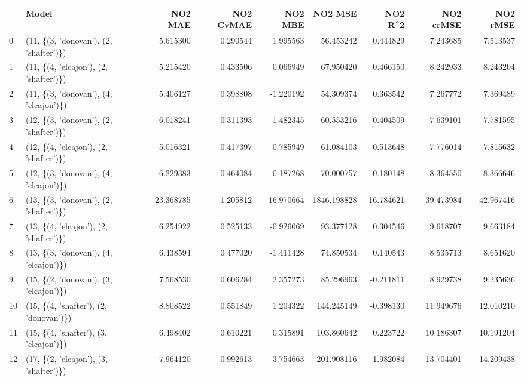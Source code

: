 \begin{tabular}{llrrrrrrr}
\toprule
{} &                                   Model &    NO2 MAE &  NO2 CvMAE &    NO2 MBE &      NO2 MSE &    NO2 R\textasciicircum2 &  NO2 crMSE &   NO2 rMSE \\
\midrule
0  &  (11, \{(3, 'donovan'), (2, 'shafter')\}) &   5.615300 &   0.290544 &   1.995563 &    56.453242 &   0.444829 &   7.243685 &   7.513537 \\
1  &  (11, \{(4, 'elcajon'), (2, 'shafter')\}) &   5.215420 &   0.433506 &   0.066949 &    67.950420 &   0.466150 &   8.242933 &   8.243204 \\
2  &  (11, \{(3, 'donovan'), (4, 'elcajon')\}) &   5.406127 &   0.398808 &  -1.220192 &    54.309374 &   0.363542 &   7.267772 &   7.369489 \\
3  &  (12, \{(3, 'donovan'), (2, 'shafter')\}) &   6.018241 &   0.311393 &  -1.482345 &    60.553216 &   0.404509 &   7.639101 &   7.781595 \\
4  &  (12, \{(4, 'elcajon'), (2, 'shafter')\}) &   5.016321 &   0.417397 &   0.785949 &    61.084103 &   0.513648 &   7.776014 &   7.815632 \\
5  &  (12, \{(3, 'donovan'), (4, 'elcajon')\}) &   6.229383 &   0.464084 &   0.187268 &    70.000757 &   0.180148 &   8.364550 &   8.366646 \\
6  &  (13, \{(3, 'donovan'), (2, 'shafter')\}) &  23.368785 &   1.205812 & -16.970664 &  1846.198828 & -16.784621 &  39.473984 &  42.967416 \\
7  &  (13, \{(4, 'elcajon'), (2, 'shafter')\}) &   6.254922 &   0.525133 &  -0.926069 &    93.377128 &   0.304546 &   9.618707 &   9.663184 \\
8  &  (13, \{(3, 'donovan'), (4, 'elcajon')\}) &   6.438594 &   0.477020 &  -1.411428 &    74.850534 &   0.140543 &   8.535713 &   8.651620 \\
9  &  (15, \{(2, 'donovan'), (3, 'elcajon')\}) &   7.568530 &   0.606284 &   2.357273 &    85.296963 &  -0.211811 &   8.929738 &   9.235636 \\
10 &  (15, \{(4, 'shafter'), (2, 'donovan')\}) &   8.808522 &   0.551849 &   1.204322 &   144.245149 &  -0.398130 &  11.949676 &  12.010210 \\
11 &  (15, \{(4, 'shafter'), (3, 'elcajon')\}) &   6.498402 &   0.610221 &   0.315891 &   103.860642 &   0.223722 &  10.186307 &  10.191204 \\
12 &  (17, \{(2, 'elcajon'), (3, 'shafter')\}) &   7.964120 &   0.992613 &  -3.754663 &   201.908116 &  -1.982084 &  13.704401 &  14.209438 \\

\end{tabular}
